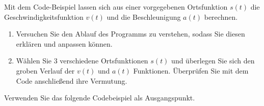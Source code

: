 \begin{ExerciseBlock}
Mit dem Code-Beispiel lassen sich aus einer vorgegebenen Ortsfunktion $s(t)$ die Geschwindigkeitsfunktion $v(t)$ und die Beschleunigung $a(t)$ berechnen.

\begin{enumerate}
	\item Versuchen Sie den Ablauf des Programms zu verstehen, sodass Sie diesen erklären und anpassen können.

	\item Wählen Sie 3 verschiedene Ortsfunktionen $s(t)$ und überlegen Sie sich den groben Verlauf der $v(t)$ und $a(t)$ Funktionen. Überprüfen Sie mit dem Code anschließend ihre Vermutung.

\end{enumerate}

Verwenden Sie das folgende Codebeispiel als Ausgangspunkt.
\end{ExerciseBlock}
